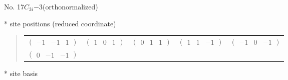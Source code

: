 \documentclass[fleqn,9pt,landscape]{jsarticle}
\begin{document}
\newpage
\begin{center}
\LARGE
No. 17\quad$C_{3i}$\quad$-3$\quad[ trigonal ] (orthonormalized)
\end{center}
\vspace{5mm}
* site positions (reduced coordinate)
\begin{quote}
\begin{tabular}{ccccc}
$ \begin{pmatrix} -1 & -1 & 1 \end{pmatrix} $ & $ \begin{pmatrix} 1 & 0 & 1 \end{pmatrix} $ & $ \begin{pmatrix} 0 & 1 & 1 \end{pmatrix} $ & $ \begin{pmatrix} 1 & 1 & -1 \end{pmatrix} $ & $ \begin{pmatrix} -1 & 0 & -1 \end{pmatrix} $ \\
$ \begin{pmatrix} 0 & -1 & -1 \end{pmatrix} $ & $  $ & $  $ & $  $ & $  $
\end{tabular}
\end{quote}
* site basis
\end{document}
